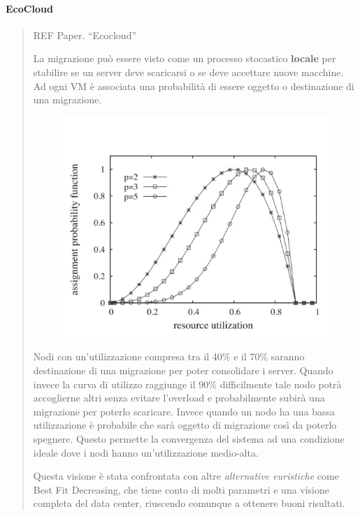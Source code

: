 \documentclass{article}
\begin{document}
		\paragraph{EcoCloud}
		\begin{quote}
		REF Paper. ``Ecocloud''
		
		La migrazione può essere visto come un processo stocastico \textbf{locale} per stabilire se un server deve scaricarsi o se deve accettare nuove macchine. Ad
		ogni VM è associata una probabilità di essere
		oggetto o destinazione di una
		migrazione.
		
		\begin{figure}[ht]
			\centering
			\includegraphics[width=0.7\linewidth]{SAC_B8_ecocloud}
			\label{fig:sacb8ecocloud}
		\end{figure}
		
		Nodi con un'utilizzazione compresa tra il 40\% e il 70\% saranno destinazione di una migrazione per poter consolidare i server. Quando invece la curva di utilizzo raggiunge il 90\% difficilmente tale nodo potrà accoglierne altri senza evitare l'overload e probabilmente subirà una migrazione per poterlo scaricare. Invece quando un nodo ha una bassa utilizzazione è probabile che sarà oggetto di migrazione così da poterlo spegnere. Questo permette la convergenza
		del sistema ad una condizione ideale dove i
		nodi hanno un'utilizzazione medio-alta.
		
		Questa visione è stata confrontata con altre \emph{alternative
		euristiche} come Best Fit Decreasing, che tiene conto di
		molti parametri e una visione completa del data center,
		riuscendo comunque a ottenere buoni risultati.
		\end{quote}
		
\end{document}
